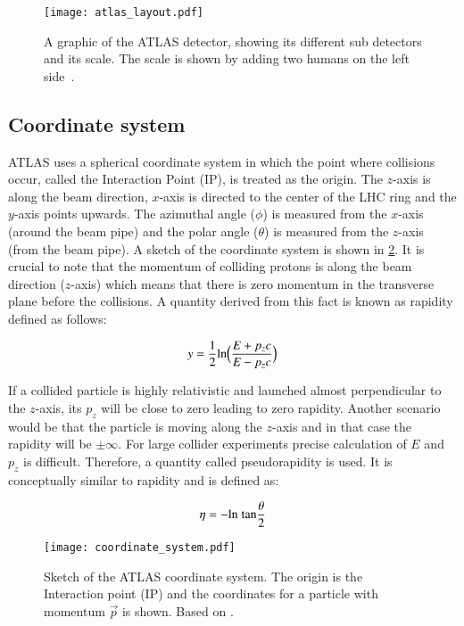 \begin{figure}[htbp]
    \centering
    \texttt{[image: atlas\_layout.pdf]}
    \caption[Overview of the ATLAS detector]{A graphic of the ATLAS detector, showing its different 
    sub detectors and its scale. The scale is shown by adding two humans on the left side~\cite{Pequenao:1095924}.}%
    \label{fig:atlas}
\end{figure}

\subsection{Coordinate system}
ATLAS uses a spherical coordinate system in which the point where collisions occur, called the 
Interaction Point (IP), is treated as the origin. The $z$-axis is along the beam direction, $x$-axis is
directed to the center of the LHC ring and the $y$-axis points upwards. The azimuthal angle ($\phi$) 
is measured from the $x$-axis (around the beam pipe) and the polar angle ($\theta$) is measured 
from the $z$-axis (from the beam pipe). A sketch of the coordinate
system is shown in \cref{fig:coordinatesys}. It is crucial to note that the momentum of colliding protons
is along the beam direction ($z$-axis) which means that there is zero momentum in the transverse plane before
the collisions. A quantity derived from this fact is known as rapidity defined as follows:


\begin{equation}
    y = \frac{1}{2}\text{ln} \Bigl(\frac{E+p_zc}{E-p_zc}\Bigl)
\end{equation}


If a collided particle is highly relativistic and launched almost perpendicular to the $z$-axis, its $p_z$ will be close to zero leading to zero rapidity.
Another scenario would be that the particle is moving along the $z$-axis and in that case the rapidity will be $\pm \infty$. For large
collider experiments precise calculation of $E$ and $p_z$ is difficult. Therefore, a quantity called pseudorapidity is used. It is conceptually similar to 
rapidity and is defined as:

\begin{equation}
    \eta = -\text{ln}\hspace{0.1cm}\text{tan}\frac{\theta}{2}
\end{equation}

\begin{figure}[htbp]
    \centering
    \texttt{[image: coordinate\_system.pdf]}
    \caption[Sketch of the ATLAS coordinate system]{Sketch of the ATLAS coordinate system. 
    The origin is the Interaction point (IP) and the coordinates for a particle 
    with momentum $\vec{p}$ is shown. Based on \cite{coordinatesys}.}%
    \label{fig:coordinatesys}
\end{figure}

